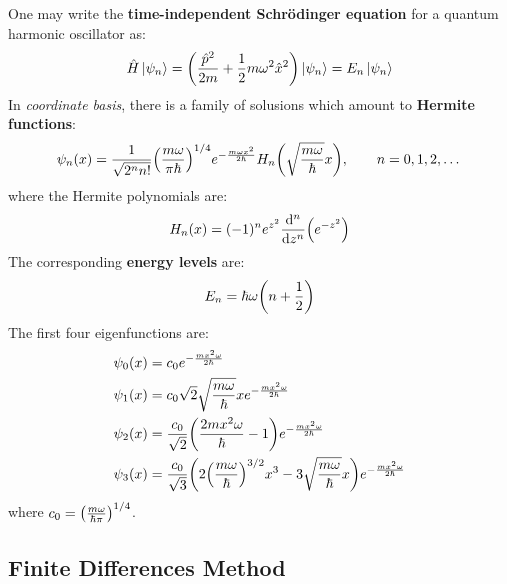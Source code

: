 \documentclass[rmp,10pt,onecolumn,fleqn,notitlepage]{revtex4-1}
\begin{document}
One may write the \textbf{time-independent Schrödinger equation} for a quantum harmonic oscillator as:
\begin{equation}
  \hat{H} \ket{\psi_n }  = \qty( \frac{\hat{p}^2}{2m} +\frac{1}{2} m \omega ^2 \hat{x}^2) \ket{\psi_n } = E_n \ket{\psi_n }
\end{equation}
In \emph{coordinate basis}, there is a family of solusions which amount to \textbf{Hermite functions}:
\begin{equation}
  \psi _n (x) = \frac{1}{\sqrt{2^n n!} } \qty(\frac{m \omega }{\pi  \hbar })^{1/4} e^{-\frac{m \omega x^2}{2 \hbar }} H_n \qty( \sqrt{\frac{m \omega }{\hbar }} x)  , \qquad n= 0,1,2, \dots
\end{equation}
where the Hermite polynomials are:
\begin{equation}
  H_n (x) = (-1)^n e^{z^2} \dv[n]{}{z} \qty(e^{-z^2} )
\end{equation}
The corresponding \textbf{energy levels} are:
\begin{equation}
  E_n = \hbar  \omega  \qty(n + \frac{1}{2})
\end{equation}
The first four eigenfunctions are:
\begin{subequations}
\begin{align}
  \psi _0 (x) &= c_0 e^{-\frac{m x^2 \omega }{2 \hbar }} \\
  \psi _1 (x) &= c_0 \sqrt{2} \sqrt{\frac{m \omega }{\hbar }}  x e^{-\frac{m x^2 \omega }{2 \hbar }} \\
  \psi _2 (x) &= \frac{c_0}{\sqrt{2}} \qty(\frac{2 m x^2 \omega }{\hbar } -1) e^{-\frac{m x^2 \omega }{2 \hbar }} \\
  \psi _3 (x) &= \frac{c_0}{\sqrt{3}} \qty(2 \qty( \frac{m \omega  }{\hbar })^{3/2} x^3 - 3 \sqrt{\frac{m \omega }{\hbar }} x ) e^{-\frac{m x^2 \omega }{2 \hbar }}
\end{align}
\end{subequations}
where \( c_0 = \qty(\frac{m \omega }{\hbar  \pi })^{1/4}  \).

\subsection{Finite Differences Method}
\end{document}
